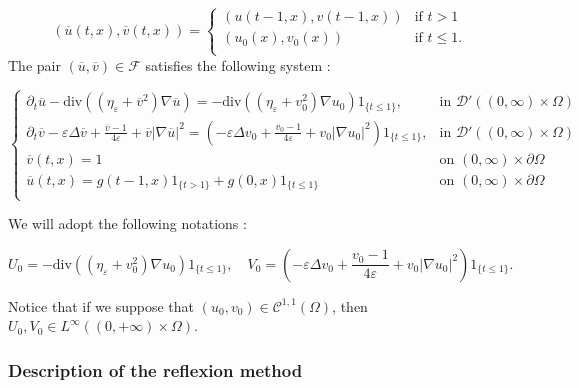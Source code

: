 \documentclass[reqno,12pt,twoside]{amsart}
\numberwithin{equation}{section} \numberwithin{theorem}{section}
\numberwithin{proposition}{section} \numberwithin{lemma}{section}
\numberwithin{corollary}{section}
\numberwithin{definition}{section} \numberwithin{remark}{section}
\begin{document}
\begin{equation}\label{extension u,v def}
(\overline{u}(t,x), \overline{v}(t,x)) = \left\{\begin{array}{ll}
(u(t-1,x),v(t-1,x)) & \text{if } t >1\\
(u_0(x), v_0(x)) & \text{if } t\leqslant 1.\\
\end{array}
\right.
\end{equation} 
The pair $(\overline{u}, \overline{v})\in \mathcal{F}$ satisfies the following system : 

\begin{equation}\label{extension uv eq}
\left\{\begin{array}{ll}
\partial_t \overline{u} - \text{div}((\eta_\varepsilon + \overline{v}^2) \nabla \overline{u}) = - \text{div}((\eta_\varepsilon + v_0^2) \nabla u_0) 1_{\{t\leqslant 1\}}, &\text{in } \mathcal{D}'((0,\infty)\times\Omega)\\
\partial_t \overline{v} - \varepsilon \Delta \overline{v} + \frac{\overline{v}-1}{4\varepsilon} + \overline{v}|\nabla \overline{u}|^2 = (- \varepsilon \Delta v_0 + \frac{v_0-1}{4\varepsilon} + v_0|\nabla u_0|^2)1_{\{t\leqslant 1\}},  &\text{in } \mathcal{D}'((0,\infty)\times \Omega)\\
\overline{v}(t,x) = 1 & \text{on } (0,\infty) \times \partial\Omega \\
\overline{u}(t,x) = g(t-1,x)1_{\{t > 1\}} + g(0,x) 1_{\{t\leqslant 1\}} & \text{on } (0,\infty) \times \partial\Omega\\
\end{array}\right. 
\end{equation}

We will adopt the following notations : 

\begin{equation}\label{def U0 V0}
U_0 = - \text{div}((\eta_\varepsilon + v_0^2) \nabla u_0) 1_{\{t\leqslant 1\}}, \quad V_0 = \left(- \varepsilon \Delta v_0 + \frac{v_0-1}{4\varepsilon} + v_0|\nabla u_0|^2\right)1_{\{t\leqslant 1\}}.
\end{equation}

Notice that if we suppose that $(u_0, v_0) \in \mathcal{C}^{1,1}(\Omega)$, then $U_0, V_0\in L^\infty((0,+\infty) \times \Omega)$. 

\subsubsection{Description of the reflexion method}
\end{document}
